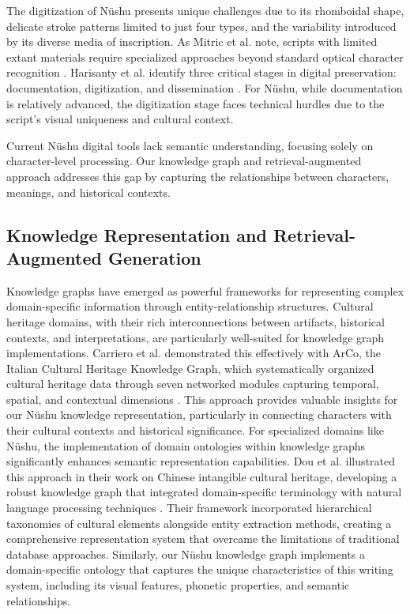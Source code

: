 \documentclass{article}
\begin{document}
    The digitization of N\"{u}shu presents unique challenges due to its rhomboidal shape, delicate stroke patterns limited to just four types, and the variability introduced by its diverse media of inscription. As Mitric et al. note, scripts with limited extant materials require specialized approaches beyond standard optical character recognition \cite{mitricAIComputerVision2024}. Harisanty et al. identify three critical stages in digital preservation: documentation, digitization, and dissemination \cite{harisantyculturalheritagepreservation2024}. For N\"{u}shu, while documentation is relatively advanced, the digitization stage faces technical hurdles due to the script's visual uniqueness and cultural context.
    
    Current N\"{u}shu digital tools lack semantic understanding, focusing solely on character-level processing. Our knowledge graph and retrieval-augmented approach addresses this gap by capturing the relationships between characters, meanings, and historical contexts.

\subsection{Knowledge Representation and Retrieval-Augmented Generation}
\label{ssec:kg_rag}
    Knowledge graphs have emerged as powerful frameworks for representing complex domain-specific information through entity-relationship structures. Cultural heritage domains, with their rich interconnections between artifacts, historical contexts, and interpretations, are particularly well-suited for knowledge graph implementations. Carriero et al. demonstrated this effectively with ArCo, the Italian Cultural Heritage Knowledge Graph, which systematically organized cultural heritage data through seven networked modules capturing temporal, spatial, and contextual dimensions \cite{carrieroArCoItalianCultural2019}. This approach provides valuable insights for our N\"{u}shu knowledge representation, particularly in connecting characters with their cultural contexts and historical significance.
    For specialized domains like N\"{u}shu, the implementation of domain ontologies within knowledge graphs significantly enhances semantic representation capabilities. Dou et al. illustrated this approach in their work on Chinese intangible cultural heritage, developing a robust knowledge graph that integrated domain-specific terminology with natural language processing techniques \cite{douKnowledgeGraphBased2018}. Their framework incorporated hierarchical taxonomies of cultural elements alongside entity extraction methods, creating a comprehensive representation system that overcame the limitations of traditional database approaches. Similarly, our N\"{u}shu knowledge graph implements a domain-specific ontology that captures the unique characteristics of this writing system, including its visual features, phonetic properties, and semantic relationships.
    
\end{document}
